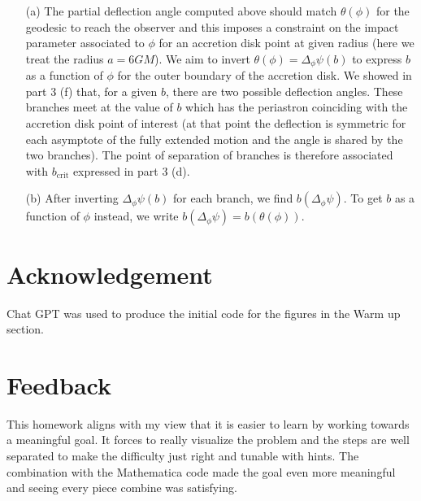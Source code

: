 \documentclass[10pt, a4paper]{article}
\begin{document}
\begin{enumerate}
  \item[(a)] The partial deflection angle computed above should match $\theta(\phi)$ for the geodesic to reach the observer and this imposes a constraint on the impact parameter associated to $\phi$ for an accretion disk point at given radius (here we treat the radius $a = 6GM$). We aim to invert  $\theta(\phi) = \Delta_{\phi} \psi(b)$ to express $b$ as a function of $\phi$ for the outer boundary of the accretion disk. We showed in part 3 (f) that, for a given $b$, there are two possible deflection angles. These branches meet at the value of $b$ which has the periastron coinciding with the accretion disk point of interest (at that point the deflection is symmetric for each asymptote of the fully extended motion and the angle is shared by the two branches). The point of separation of branches is therefore associated with $b_{\text{crit}}$ expressed in part 3 (d). 
  \item[(b)] After inverting $\Delta_{\phi} \psi(b)$ for each branch, we find $b(\Delta_{\phi} \psi)$. To get $b$ as a function of $\phi$ instead, we write $b(\Delta_{\phi} \psi) = b(\theta(\phi))$. 
\end{enumerate}


\section{Acknowledgement}

Chat GPT was used to produce the initial code for the figures in the Warm up section.

\section{Feedback}

This homework aligns with my view that it is easier to learn by working towards a meaningful goal. It forces to really visualize the problem and the steps are well separated to make the difficulty just right and tunable with hints. The combination with the Mathematica code made the goal even more meaningful and seeing every piece combine was satisfying. 

\makereferences


\end{document}

